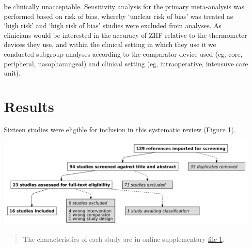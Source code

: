 \documentclass[smallextended]{svjour3}       %
\begin{document}
be clinically unacceptable. Sensitivity analysis for the primary
meta-analysis was performed based on risk of bias, whereby `unclear risk
of bias' was treated as `high risk' and `high risk of bias' studies were
excluded from analyses. As clinicians would be interested in the
accuracy of ZHF relative to the thermometer devices they use, and within
the clinical setting in which they use it we conducted subgroup analyses
according to the comparator device used (eg, core, peripheral,
nasopharangeal) and clinical setting (eg, intraoperative, intensuve care
unit).

\hypertarget{results}{%
\section{Results}\label{results}}

Sixteen studies were eligible for inclusion in this systematic review
(Figure 1).

\includegraphics[width=53.08in]{figure_one}

\begin{quote}
The characteristics of each study are in online supplementary
\href{link\%20to\%20file\%201}{file 1}.
\end{quote}
\end{document}
